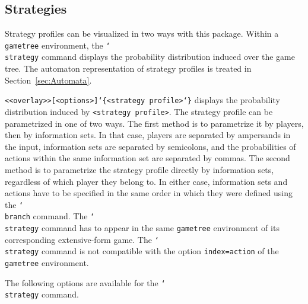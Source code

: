 \documentclass{article}
\newenvironment{desc}{\itemize[leftmargin=50pt]}{\enditemize}
\def\macroarg#1#2{\item[\cmd{#1}] \hskip-2.5pt\texttt{#2}}
\renewcommand{\textbackslash}{\char`\\}
\def\cmd#1{\texttt{\color{cmd}\textbackslash#1}}
\def\leftbrace{\char`\{}
\def\rightbrace{\char`\}}
\def\arg#1{{\color{cmd}\leftbrace}{\color{black}#1}{\color{cmd}\rightbrace}}
\def\optarg[#1]{{\color{player1}[#1]}}
\begin{document}
\subsection{Strategies}

Strategy profiles can be visualized in two ways with this package. Within a \texttt{gametree} environment, the \cmd{strategy} command displays the probability distribution induced over the game tree. The automaton representation of strategy profiles is treated in Section~\ref{sec:Automata}.

\begin{desc}
\macroarg{strategy}{<<overlay>>\optarg[<options>]\arg{<strategy profile>}} displays the probability distribution induced by \texttt{<strategy profile>}. The strategy profile can be parametrized in one of two ways. The first method is to parametrize it by players, then by information sets. In that case, players are separated by ampersands in the input, information sets are separated by semicolons, and the probabilities of actions within the same information set are separated by commas. The second method is to parametrize the strategy profile directly by information sets, regardless of which player they belong to. In either case, information sets and actions have to be specified in the same order in which they were defined using the \cmd{branch} command. The \cmd{strategy} command has to appear in the same \texttt{gametree} environment of its corresponding extensive-form game. The \cmd{strategy} command is not compatible with the option \texttt{index=action} of the \texttt{gametree} environment.
\end{desc}

\noindent The following options are available for the \cmd{strategy} command.
\end{document}
